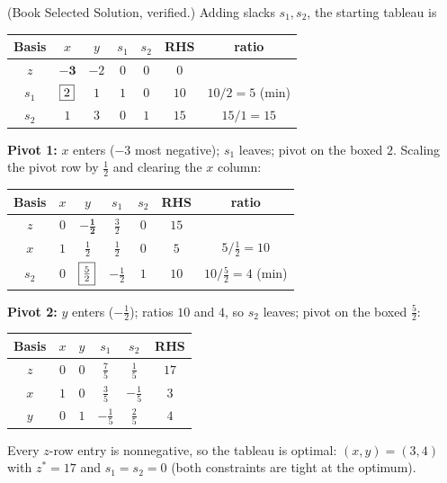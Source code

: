 
(Book Selected Solution, verified.) Adding slacks $s_1, s_2$, the
starting tableau is
\begin{center}
\renewcommand{\arraystretch}{1.3}
\begin{tabular}{c|cccc|c|c}
Basis & $x$ & $y$ & $s_1$ & $s_2$ & RHS & ratio\\
\hline
$z$   & $\mathbf{-3}$ & $-2$ & $0$ & $0$ & $0$ & \\
\hline
$s_1$ & $\fbox{2}$ & $1$ & $1$ & $0$ & $10$ & $10/2 = 5$ (min)\\
$s_2$ & $1$ & $3$ & $0$ & $1$ & $15$ & $15/1 = 15$\\
\end{tabular}
\end{center}

\textbf{Pivot 1:} $x$ enters ($-3$ most negative); $s_1$ leaves; pivot on
the boxed $2$. Scaling the pivot row by $\tfrac12$ and clearing the $x$
column:
\begin{center}
\renewcommand{\arraystretch}{1.3}
\begin{tabular}{c|cccc|c|c}
Basis & $x$ & $y$ & $s_1$ & $s_2$ & RHS & ratio\\
\hline
$z$   & $0$ & $\mathbf{-\tfrac12}$ & $\tfrac32$ & $0$ & $15$ & \\
\hline
$x$   & $1$ & $\tfrac12$ & $\tfrac12$ & $0$ & $5$ & $5/\tfrac12 = 10$\\
$s_2$ & $0$ & $\fbox{$\tfrac52$}$ & $-\tfrac12$ & $1$ & $10$ & $10/\tfrac52 = 4$ (min)\\
\end{tabular}
\end{center}

\textbf{Pivot 2:} $y$ enters ($-\tfrac12$); ratios $10$ and $4$, so
$s_2$ leaves; pivot on the boxed $\tfrac52$:
\begin{center}
\renewcommand{\arraystretch}{1.3}
\begin{tabular}{c|cccc|c}
Basis & $x$ & $y$ & $s_1$ & $s_2$ & RHS\\
\hline
$z$   & $0$ & $0$ & $\tfrac75$ & $\tfrac15$ & $17$\\
\hline
$x$ & $1$ & $0$ & $\tfrac35$ & $-\tfrac15$ & $3$\\
$y$ & $0$ & $1$ & $-\tfrac15$ & $\tfrac25$ & $4$\\
\end{tabular}
\end{center}
Every $z$-row entry is nonnegative, so the tableau is optimal:
$(x, y) = (3, 4)$ with $z^* = 17$ and $s_1 = s_2 = 0$ (both constraints
are tight at the optimum).

